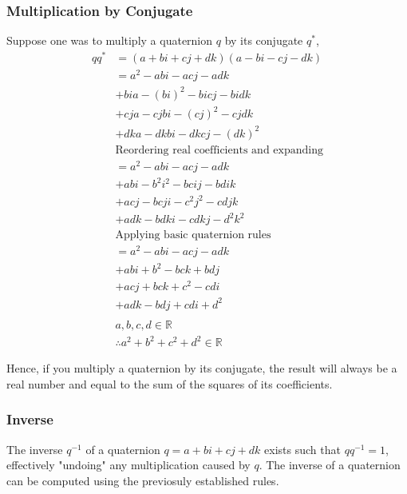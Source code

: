 \documentclass[12pt, a4paper]{article}
\begin{document}
\subsubsection{Multiplication by Conjugate}
Suppose one was to multiply a quaternion $q$ by its conjugate $q^*$,
\begin{align*}
    qq^* & = (a + bi + cj + dk)(a - bi - cj - dk)            \\
         & = a^2 - abi - acj - adk                           \\
         & + bia - (bi)^2 - bicj - bidk                      \\
         & + cja - cjbi - (cj)^2 - cjdk                      \\
         & + dka - dkbi - dkcj - (dk)^2                      \\
         & \text{Reordering real coefficients and expanding} \\
         & = a^2 - abi - acj - adk                           \\
         & + abi - b^2i^2 - bcij - bdik                      \\
         & + acj - bcji - c^2j^2 - cdjk                      \\
         & + adk - bdki - cdkj - d^2k^2                      \\
         & \text{Applying basic quaternion rules}            \\
         & = a^2 - abi - acj - adk                           \\
         & + abi + b^2 - bck + bdj                           \\
         & + acj + bck + c^2 - cdi                           \\
         & + adk - bdj + cdi + d^2                           \\
    \\
         & a, b, c, d \in \mathbb{R}                         \\
         & \therefore a^2 + b^2 + c^2 + d^2 \in \mathbb{R}
\end{align*}

Hence, if you multiply a quaternion by its conjugate, the result will always be
a real number and equal to the sum of the squares of its coefficients.


\subsubsection{Inverse}
The inverse $q^{-1}$ of a quaternion $q = a + bi + cj + dk$ exists such that $qq^{-1} = 1$,
effectively "undoing" any multiplication caused by $q$. The inverse of a
quaternion can be computed using the previosuly established rules.
\end{document}
